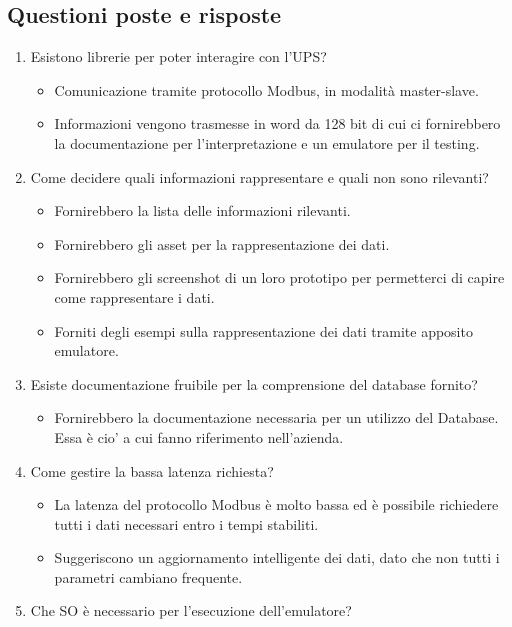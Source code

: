 \subsection{Questioni poste e risposte}
\begin{enumerate}
    \item Esistono librerie per poter interagire con l'UPS?
    \begin{itemize} 
        \item Comunicazione tramite protocollo Modbus, in modalità master-slave.
        \item Informazioni vengono trasmesse in word da 128 bit di cui ci fornirebbero la documentazione per l'interpretazione e un emulatore per il testing.
    \end{itemize}
    \item Come decidere quali informazioni rappresentare e quali non sono rilevanti?
    \begin{itemize}
        \item Fornirebbero la lista delle informazioni rilevanti.
        \item Fornirebbero gli asset per la rappresentazione dei dati.
        \item Fornirebbero gli screenshot di un loro prototipo per permetterci di capire come rappresentare i dati.
        \item Forniti degli esempi sulla rappresentazione dei dati tramite apposito emulatore.
    \end{itemize}
    \item Esiste documentazione fruibile per la comprensione del database fornito?
    \begin{itemize}
        \item Fornirebbero la documentazione necessaria per un utilizzo del Database. Essa è cio' a cui fanno riferimento nell'azienda.
    \end{itemize}
    \item Come gestire la bassa latenza richiesta?
    \begin{itemize}
        \item La latenza del protocollo Modbus è molto bassa ed è possibile richiedere tutti i dati necessari entro i tempi stabiliti.
        \item Suggeriscono un aggiornamento intelligente dei dati, dato che non tutti i parametri cambiano frequente.
    \end{itemize}
    \item Che SO è necessario per l'esecuzione dell'emulatore?

\end{enumerate}
